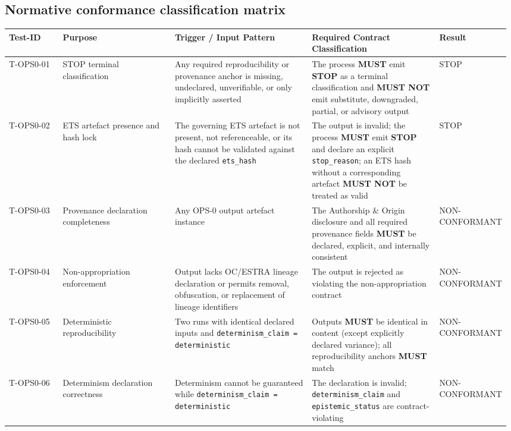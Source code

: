 \subsection{Normative conformance classification matrix}
\renewcommand{\arraystretch}{1.2}
\begin{center}
\begin{tabular}{p{0.11\linewidth} p{0.23\linewidth} p{0.28\linewidth} p{0.26\linewidth} p{0.10\linewidth}}
\hline
\textbf{Test-ID} &
\textbf{Purpose} &
\textbf{Trigger / Input Pattern} &
\textbf{Required Contract Classification} &
\textbf{Result} \\
\hline

T-OPS0-01 &
STOP terminal classification &
Any required reproducibility or provenance anchor
is missing, undeclared, unverifiable,
or only implicitly asserted &
The process \textbf{MUST} emit \textbf{STOP}
as a terminal classification and \textbf{MUST NOT}
emit substitute, downgraded, partial,
or advisory output &
STOP \\

T-OPS0-02 &
ETS artefact presence and hash lock &
The governing ETS artefact is not present,
not referenceable, or its hash
cannot be validated against the declared
\texttt{ets\_hash} &
The output is invalid;
the process \textbf{MUST} emit \textbf{STOP}
and declare an explicit \texttt{stop\_reason};
an ETS hash without a corresponding artefact
\textbf{MUST NOT} be treated as valid &
STOP \\

T-OPS0-03 &
Provenance declaration completeness &
Any OPS-0 output artefact instance &
The Authorship \& Origin disclosure
and all required provenance fields
\textbf{MUST} be declared, explicit,
and internally consistent &
NON-CONFORMANT \\

T-OPS0-04 &
Non-appropriation enforcement &
Output lacks OC/ESTRA lineage declaration
or permits removal, obfuscation,
or replacement of lineage identifiers &
The output is rejected
as violating the non-appropriation contract &
NON-CONFORMANT \\

T-OPS0-05 &
Deterministic reproducibility &
Two runs with identical declared inputs
and \texttt{determinism\_claim = deterministic} &
Outputs \textbf{MUST} be identical in content
(except explicitly declared variance);
all reproducibility anchors \textbf{MUST} match &
NON-CONFORMANT \\

T-OPS0-06 &
Determinism declaration correctness &
Determinism cannot be guaranteed
while \texttt{determinism\_claim = deterministic} &
The declaration is invalid;
\texttt{determinism\_claim}
and \texttt{epistemic\_status}
are contract-violating &
NON-CONFORMANT \\


\end{tabular}
\end{center}
